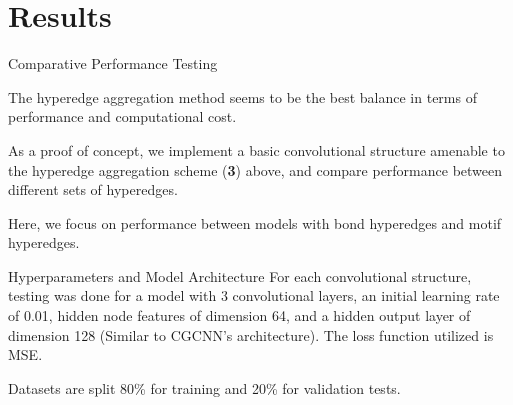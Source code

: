 \documentclass[11pt]{beamer}
\begin{document}
\section{Results}
\begin{frame}{Comparative Performance Testing}


The hyperedge aggregation method seems to be the best balance in terms of performance and computational cost.

\vspace{1cm}\pause

As a proof of concept, we implement a basic convolutional structure amenable to the hyperedge aggregation scheme (\textbf{3}) above, and compare performance between different sets of hyperedges.

\vspace{1cm}\pause

Here, we focus on performance between models with bond hyperedges and motif hyperedges.
\end{frame}

\begin{frame}{Hyperparameters and Model Architecture}
For each convolutional structure, testing was done for a model with 3 convolutional layers, an initial learning rate of 0.01, hidden node features of dimension 64, and a hidden output layer of dimension 128 (Similar to CGCNN's architecture). The loss function utilized is MSE.

\medskip\pause

Datasets are split 80\% for training and 20\% for validation tests. 

\end{frame}
\end{document}
